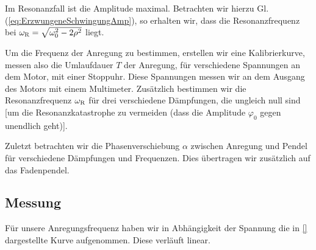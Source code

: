 \documentclass[11pt,a4paper,titlepage, ngerman]{article}
\newcommand{\refeq}[1]{Gl. (\ref{eq:#1})}
\begin{document}
			Im Resonanzfall ist die Amplitude maximal. Betrachten wir hierzu \refeq{ErzwungeneSchwingungAmp}, so erhalten wir, dass die Resonanzfrequenz bei $\omega_\textsc{R} = \sqrt{\omega_0^2-2\rho^2}$ liegt.
			
			Um die Frequenz der Anregung zu bestimmen, erstellen wir eine Kalibrierkurve, messen also die Umlaufdauer $T$ der Anregung, für verschiedene Spannungen an dem Motor, mit einer Stoppuhr. Diese Spannungen messen wir an dem Ausgang des Motors mit einem Multimeter.
			Zusätzlich bestimmen wir die Resonanzfrequenz $\omega_\textsc{R}$ für drei verschiedene Dämpfungen, die ungleich null sind [um die Resonanzkatastrophe zu vermeiden (dass die Amplitude $\varphi_0$ gegen unendlich geht)].
				
			Zuletzt betrachten wir die Phasenverschiebung $\alpha$ zwischen Anregung und Pendel für verschiedene Dämpfungen und Frequenzen. Dies übertragen wir zusätzlich auf das Fadenpendel.
		
		\subsection*{Messung}
			
			Für unsere Anregungsfrequenz haben wir in Abhängigkeit der Spannung die in \ref{} dargestellte Kurve aufgenommen. Diese verläuft linear.
			
\end{document}
